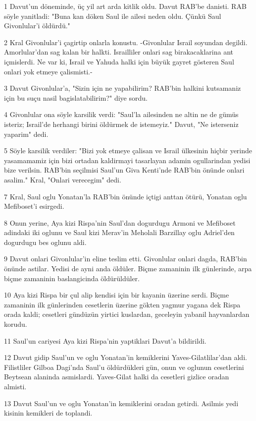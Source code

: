 \par 1 Davut'un döneminde, üç yil art arda kitlik oldu. Davut RAB'be danisti. RAB söyle yanitladi: "Buna kan döken Saul ile ailesi neden oldu. Çünkü Saul Givonlular'i öldürdü."
\par 2 Kral Givonlular'i çagirtip onlarla konustu. -Givonlular Israil soyundan degildi. Amorlular'dan sag kalan bir halkti. Israilliler onlari sag birakacaklarina ant içmislerdi. Ne var ki, Israil ve Yahuda halki için büyük gayret gösteren Saul onlari yok etmeye çalismisti.-
\par 3 Davut Givonlular'a, "Sizin için ne yapabilirim? RAB'bin halkini kutsamaniz için bu suçu nasil bagislatabilirim?" diye sordu.
\par 4 Givonlular ona söyle karsilik verdi: "Saul'la ailesinden ne altin ne de gümüs isteriz; Israil'de herhangi birini öldürmek de istemeyiz." Davut, "Ne isterseniz yaparim" dedi.
\par 5 Söyle karsilik verdiler: "Bizi yok etmeye çalisan ve Israil ülkesinin hiçbir yerinde yasamamamiz için bizi ortadan kaldirmayi tasarlayan adamin ogullarindan yedisi bize verilsin. RAB'bin seçilmisi Saul'un Giva Kenti'nde RAB'bin önünde onlari asalim." Kral, "Onlari verecegim" dedi.
\par 7 Kral, Saul oglu Yonatan'la RAB'bin önünde içtigi anttan ötürü, Yonatan oglu Mefiboset'i esirgedi.
\par 8 Onun yerine, Aya kizi Rispa'nin Saul'dan dogurdugu Armoni ve Mefiboset adindaki iki oglunu ve Saul kizi Merav'in Meholali Barzillay oglu Adriel'den dogurdugu bes oglunu aldi.
\par 9 Davut onlari Givonlular'in eline teslim etti. Givonlular onlari dagda, RAB'bin önünde astilar. Yedisi de ayni anda öldüler. Biçme zamaninin ilk günlerinde, arpa biçme zamaninin baslangicinda öldürüldüler.
\par 10 Aya kizi Rispa bir çul alip kendisi için bir kayanin üzerine serdi. Biçme zamaninin ilk günlerinden cesetlerin üzerine gökten yagmur yagana dek Rispa orada kaldi; cesetleri gündüzün yirtici kuslardan, geceleyin yabanil hayvanlardan korudu.
\par 11 Saul'un cariyesi Aya kizi Rispa'nin yaptiklari Davut'a bildirildi.
\par 12 Davut gidip Saul'un ve oglu Yonatan'in kemiklerini Yaves-Gilatlilar'dan aldi. Filistliler Gilboa Dagi'nda Saul'u öldürdükleri gün, onun ve oglunun cesetlerini Beytsean alaninda asmislardi. Yaves-Gilat halki da cesetleri gizlice oradan almisti.
\par 13 Davut Saul'un ve oglu Yonatan'in kemiklerini oradan getirdi. Asilmis yedi kisinin kemikleri de toplandi.
